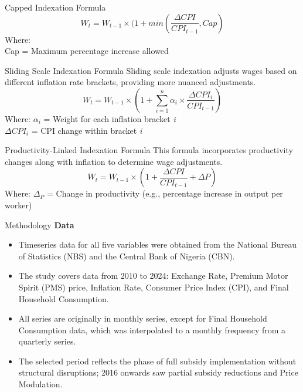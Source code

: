 \documentclass{beamer}
\begin{document}
{\begin{frame}
\begin{exampleblock}{Capped Indexation Formula}
\begin{equation}
W_t = W_{t-1}\times(1+ min \left(\frac{\Delta CPI}{CPI_{t-1}}, Cap\right)
\end{equation}
Where: \\
Cap = Maximum percentage increase allowed \\
    \end{exampleblock}
\end{frame}
\begin{frame}
\begin{block}{Sliding Scale Indexation Formula}
Sliding scale indexation adjusts wages based on different inflation rate brackets, providing more nuanced adjustments.
\begin{equation}
W_t = W_{t-1} \times \left(1 + \sum_{i=1}^{n} \alpha_i \times \frac{\Delta CPI_i}{CPI_{t-1}}\right)
\end{equation}
Where: $\alpha_{i}$ = Weight for each inflation bracket \textit{i} \\
 $\Delta CPI_{i}$ = CPI change within bracket \textit{i} \\
  \end{block}
  \begin{exampleblock}{Productivity-Linked Indexation Formula}
This formula incorporates productivity changes along with inflation to determine wage adjustments.
\begin{equation}
W_t = W_{t-1} \times \left(1 + \frac{\Delta CPI}{CPI_{t-1}} + \Delta P\right)
\end{equation}
Where: $\Delta_{P}$ = Change in productivity (e.g., percentage increase in output per worker)
    \end{exampleblock}
\end{frame}
\begin{frame} {Methodology}
\textbf{Data} \\
\begin{itemize}
\item Timeseries data for all five variables were obtained from the National Bureau of Statistics (NBS) and the Central Bank of Nigeria (CBN).
\item The study covers data from 2010 to 2024: Exchange Rate, Premium Motor Spirit (PMS) price, Inflation Rate, Consumer Price Index (CPI), and Final Household Consumption.
\item All series are originally in monthly series, except for Final Household Consumption data, which was interpolated to a monthly frequency from a quarterly series.
\item The selected period reflects the phase of full subsidy implementation without structural disruptions; 2016 onwards saw partial subsidy reductions and Price Modulation.

\end{itemize}
\end{frame}}
\end{document}

